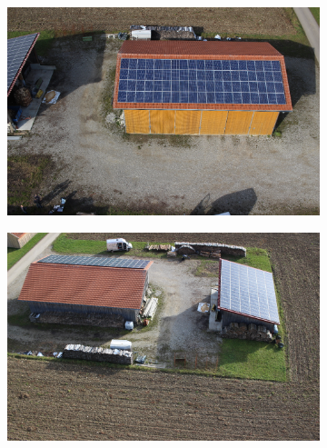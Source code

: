 \begin{figure}[H]
    \centering
       \begin{subfigure}[tbp]{0.24\columnwidth}
           \centering
           \includegraphics[width=\textwidth]{segment/fin_ori1.png}
           \caption[]{}
           {{\small }}
           \label{fig:4a}
       \end{subfigure}
       \begin{subfigure}[tbp]{0.24\columnwidth}
           \centering
           \includegraphics[width=\textwidth]{segment/fin_ori2.png}
           \caption[]{}%
           {{\small }}
           \label{fig:4b}
       \end{subfigure}
       \hfill
       \begin{subfigure}[tbp]{0.24\columnwidth}
           \centering

\end{subfigure}
\end{figure}
